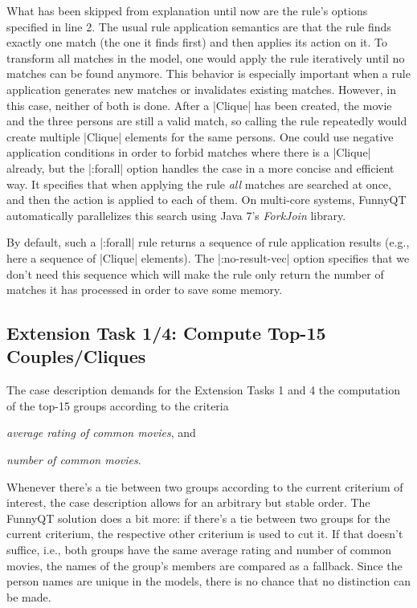 \documentclass[submission]{eptcs}
\newcommand{\code}{\clojureinline}
\begin{document}
What has been skipped from explanation until now are the rule's options
specified in line 2.  The usual rule application semantics are that the rule
finds exactly one match (the one it finds first) and then applies its action on
it.  To transform all matches in the model, one would apply the rule
iteratively until no matches can be found anymore.  This behavior is especially
important when a rule application generates new matches or invalidates existing
matches.  However, in this case, neither of both is done.  After a
\code|Clique| has been created, the movie and the three persons are still a
valid match, so calling the rule repeatedly would create multiple \code|Clique|
elements for the same persons.  One could use negative application conditions
in order to forbid matches where there is a \code|Clique| already, but the
\code|:forall| option handles the case in a more concise and efficient way.  It
specifies that when applying the rule \emph{all} matches are searched at once,
and then the action is applied to each of them.  On multi-core systems, FunnyQT
automatically parallelizes this search using Java 7's \emph{ForkJoin} library.

By default, such a \code|:forall| rule returns a sequence of rule application
results (e.g., here a sequence of \code|Clique| elements).  The
\code|:no-result-vec| option specifies that we don't need this sequence which
will make the rule only return the number of matches it has processed in order
to save some memory.


\subsection{Extension Task 1/4: Compute Top-15 Couples/Cliques}
\label{sec:ext-task-1:top-15}

The case description demands for the Extension Tasks 1 and 4 the computation of
the top-15 groups according to the criteria
\begin{inparaenum}[(a)]
\item \emph{average rating of common movies}, and
\item \emph{number of common movies}.
\end{inparaenum}

Whenever there's a tie between two groups according to the current criterium of
interest, the case description allows for an arbitrary but stable order.  The
FunnyQT solution does a bit more: if there's a tie between two groups for the
current criterium, the respective other criterium is used to cut it.  If that
doesn't suffice, i.e., both groups have the same average rating and number of
common movies, the names of the group's members are compared as a fallback.
Since the person names are unique in the models, there is no chance that no
distinction can be made.
\end{document}
